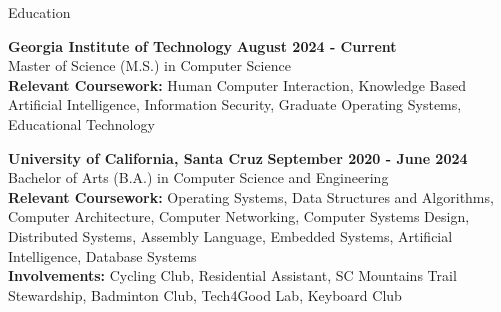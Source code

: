 \documentclass{resume}
\begin{document}
\begin{rSection}{\large Education}

{\bf Georgia Institute of Technology} \hfill {\bf{August 2024 - Current}}
\\ Master of Science (M.S.) in Computer Science\hfill %
\\ \textbf{Relevant Coursework:} Human Computer Interaction, Knowledge Based Artificial Intelligence, Information Security, Graduate Operating Systems, Educational Technology


{\bf University of California, Santa Cruz} \hfill {\bf{September 2020 - June 2024}}
\\ Bachelor of Arts (B.A.) in Computer Science and Engineering\hfill %
\\ \textbf{Relevant Coursework:} Operating Systems, Data Structures and Algorithms, Computer Architecture, Computer Networking, Computer Systems Design, Distributed Systems, Assembly Language, Embedded Systems, Artificial Intelligence, Database Systems
\\ \textbf{Involvements:} Cycling Club, Residential Assistant, SC Mountains Trail Stewardship, Badminton Club, Tech4Good Lab, Keyboard Club 

\end{rSection}
\end{document}
